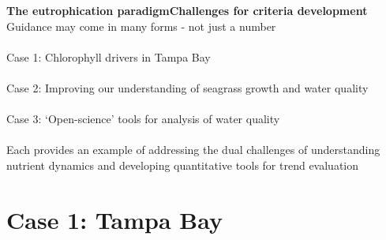 \documentclass[serif]{beamer}\usepackage[]{graphicx}\usepackage[]{color}
\begin{document}
\begin{frame}{\textbf{The eutrophication paradigm}}{\textbf{Challenges for criteria development}}
\onslide<+->
Guidance may come in many forms - not just a number \\~\\
\onslide<+->
\alert{Case 1:} Chlorophyll drivers in Tampa Bay\\~\\
\onslide<+->
\alert{Case 2:} Improving our understanding of seagrass growth and water quality\\~\\
\onslide<+->
\alert{Case 3:} `Open-science' tools for analysis of water quality\\~\\
\onslide<+->
Each provides an example of addressing the dual challenges of \alert{understanding nutrient dynamics} and \alert{developing quantitative tools} for trend evaluation 
\end{frame}

\section{Case 1: Tampa Bay}

\end{document}
